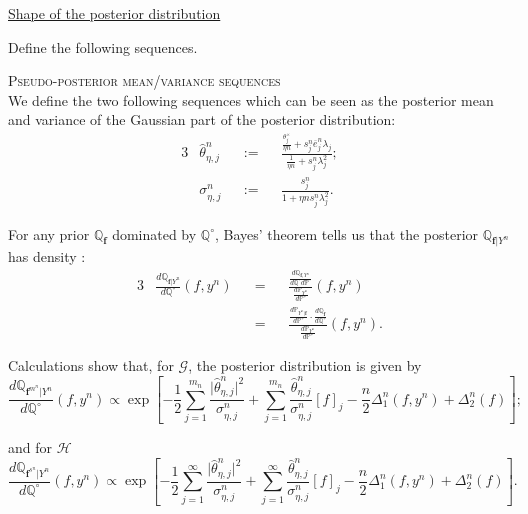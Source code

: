 \underline{Shape of the posterior distribution}

Define the following sequences.
\begin{de}{\textsc{Pseudo-posterior mean/variance sequences} \\}\label{de2.5.3}
We define the two following sequences which can be seen as the posterior mean and variance of the Gaussian part of the posterior distribution:
\begin{alignat*}{3}
& \widehat{\theta}_{\eta, j}^{n} && := && \frac{\frac{\theta^{\times}_{j}}{\eta n} + s^{n}_{j} \overline{e}_{j}^{n} \lambda_{j}}{\frac{1}{\eta n} + s^{n}_{j} \lambda_{j}^{2}};\\
& \sigma_{\eta, j}^{n} &&:=&& \frac{s^{n}_{j}}{1 + \eta n s^{n}_{j} \lambda_{j}^{2}}.
\end{alignat*}
\end{de}

For any prior $\mathds{Q}_{\boldsymbol{f}}$ dominated by $\mathds{Q}^{\circ}$, Bayes' theorem tells us that the posterior $\mathds{Q}_{\boldsymbol{f}\vert Y^{n}}$ has density :
\begin{alignat*}{3}
&\frac{d\mathds{Q}_{\boldsymbol{f}\vert Y^{n}}}{d\mathds{Q}^{\circ}}(f, y^{n}) &&=&&\frac{\frac{d \mathds{Q}_{\boldsymbol{f}, Y^{n}}}{d \mathds{Q}^{\circ}d \mathds{P}^{\circ}}}{\frac{d \mathds{P}_{Y^{n}}}{d \mathds{P}^{\circ}}}(f, y^{n})\\
& &&=&& \frac{\frac{d \mathds{P}_{Y^{n} \vert \boldsymbol{f}}}{d \mathds{P}^{\circ}} \cdot \frac{d \mathds{Q}_{\boldsymbol{f}}}{d \mathds{Q}^{\circ}}}{\frac{d\mathds{P}_{Y^{n}}}{d\mathds{P}^{\circ}}}(f, y^{n}).
\end{alignat*}

Calculations show that, for $\mathcal{G}$, the posterior distribution is given by
\[\frac{d \mathds{Q}_{\boldsymbol{f}^{m^{n}}\vert Y^{n}}}{d \mathds{Q}^{\circ}}(f, y^{n}) \propto \exp\left[-\frac{1}{2}\sum\limits_{j = 1}^{m_{n}} \frac{\vert \widehat{\theta}_{\eta, j}^{n}\vert^{2}}{\sigma_{\eta, j}^{n}} + \sum\limits_{j = 1}^{m_{n}} \frac{\widehat{\theta}_{\eta, j}^{n}}{\sigma_{\eta, j}^{n}}[f]_{j} - \frac{n}{2} \Delta_{1}^{n}(f, y^{n}) +\Delta_{2}^{n}(f)\right];\]

and for $\mathcal{H}$
\[\frac{d \mathds{Q}_{\boldsymbol{f}^{s^{n}}\vert Y^{n}}}{d \mathds{Q}^{\circ}}(f, y^{n})\propto\exp\left[-\frac{1}{2}\sum\limits_{j = 1}^{\infty} \frac{\vert \widehat{\theta}_{\eta, j}^{n}\vert^{2}}{\sigma_{\eta, j}^{n}} + \sum\limits_{j = 1}^{\infty} \frac{\widehat{\theta}_{\eta, j}^{n}}{\sigma_{\eta, j}^{n}}[f]_{j} - \frac{n}{2} \Delta_{1}^{n}(f, y^{n}) +\Delta_{2}^{n}(f)\right].\]

